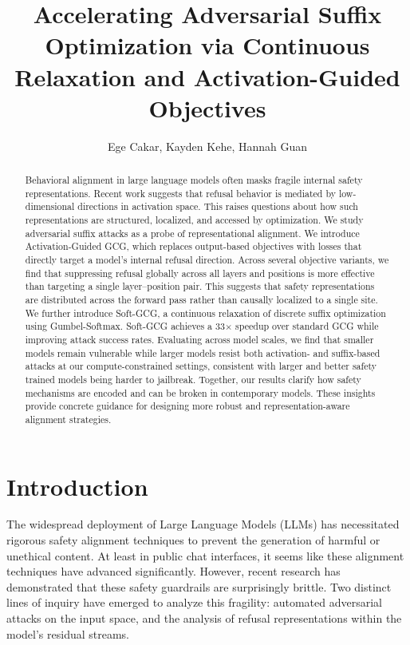 \documentclass[letterpaper]{article} %
\title{Accelerating Adversarial Suffix Optimization via Continuous Relaxation and Activation-Guided Objectives}
\author{
    Ege Cakar, Kayden Kehe, Hannah Guan
}
\begin{document}
\frenchspacing

\maketitle

\begin{abstract}
Behavioral alignment in large language models often masks fragile internal safety representations. Recent work suggests that refusal behavior is mediated by low-dimensional directions in activation space. This raises questions about how such representations are structured, localized, and accessed by optimization. We study adversarial suffix attacks as a probe of representational alignment. We introduce Activation-Guided GCG, which replaces output-based objectives with losses that directly target a model's internal refusal direction. Across several objective variants, we find that suppressing refusal globally across all layers and positions is more effective than targeting a single layer–position pair. This suggests that safety representations are distributed across the forward pass rather than causally localized to a single site. We further introduce Soft-GCG, a continuous relaxation of discrete suffix optimization using Gumbel-Softmax. Soft-GCG achieves a 33$\times$ speedup over standard GCG while improving attack success rates. Evaluating across model scales, we find that smaller models remain vulnerable while larger models resist both activation- and suffix-based attacks at our compute-constrained settings, consistent with larger and better safety trained models being harder to jailbreak. Together, our results clarify how safety mechanisms are encoded and can be broken in contemporary models. These insights provide concrete guidance for designing more robust and representation-aware alignment strategies.
\end{abstract}

\section{Introduction}


The widespread deployment of Large Language Models (LLMs) has necessitated rigorous safety alignment techniques to prevent the generation of harmful or unethical content. At least in public chat interfaces, it seems like these alignment techniques have advanced significantly. However, recent research has demonstrated that these safety guardrails are surprisingly brittle. Two distinct lines of inquiry have emerged to analyze this fragility: automated adversarial attacks on the input space, and the analysis of refusal representations within the model's residual streams.
\end{document}
